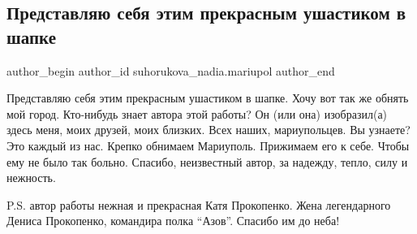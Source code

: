  
 
 
 
 

\subsection{Представляю себя этим  прекрасным ушастиком в шапке}
\label{sec:10_02_2023.fb.suhorukova_nadia.mariupol.1.predstavlyayu_sebya_}

\ifcmt
 author_begin
   author_id suhorukova_nadia.mariupol
 author_end
\fi

Представляю себя этим  прекрасным ушастиком в шапке. Хочу  вот так же обнять
мой город. Кто-нибудь знает  автора этой работы? Он (или она)  изобразил(а)
здесь  меня, моих друзей, моих близких. Всех наших,  мариупольцев. Вы узнаете?
Это каждый из нас. Крепко обнимаем  Мариуполь. Прижимаем его к себе.  Чтобы ему
не было так больно. Спасибо,  неизвестный автор,  за надежду,  тепло, силу и
нежность.

P.S. автор работы нежная и прекрасная Катя Прокопенко. Жена  легендарного
Дениса Прокопенко, командира полка \enquote{Азов}. Спасибо им до неба!

